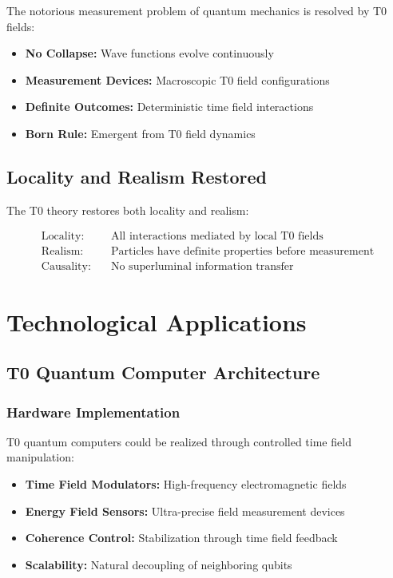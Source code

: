 \documentclass[12pt,a4paper]{article}
\begin{document}
	The notorious measurement problem of quantum mechanics is resolved by T0 fields:
	
	\begin{itemize}
		\item \textbf{No Collapse:} Wave functions evolve continuously
		\item \textbf{Measurement Devices:} Macroscopic T0 field configurations
		\item \textbf{Definite Outcomes:} Deterministic time field interactions
		\item \textbf{Born Rule:} Emergent from T0 field dynamics
	\end{itemize}
	
	\subsection{Locality and Realism Restored}
	
	The T0 theory restores both locality and realism:
	
	\begin{align}
		\text{Locality:} &\quad \text{All interactions mediated by local T0 fields} \\
		\text{Realism:} &\quad \text{Particles have definite properties before measurement} \\
		\text{Causality:} &\quad \text{No superluminal information transfer}
	\end{align}
	
	\section{Technological Applications}
	
	\subsection{T0 Quantum Computer Architecture}
	
	\subsubsection{Hardware Implementation}
	
	T0 quantum computers could be realized through controlled time field manipulation:
	
	\begin{itemize}
		\item \textbf{Time Field Modulators:} High-frequency electromagnetic fields
		\item \textbf{Energy Field Sensors:} Ultra-precise field measurement devices
		\item \textbf{Coherence Control:} Stabilization through time field feedback
		\item \textbf{Scalability:} Natural decoupling of neighboring qubits
	\end{itemize}
	
\end{document}
